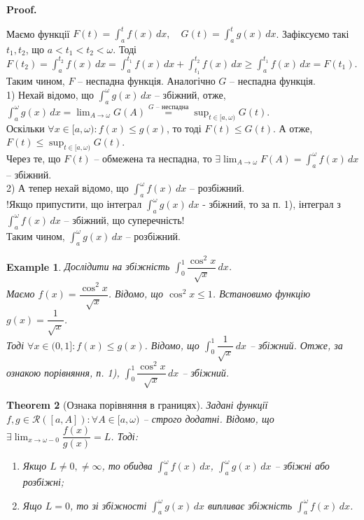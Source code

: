 \documentclass[a4paper, 10pt]{article}
\makeatletter
\def\huge{\displaystyle}
\theoremstyle{theoremdd}
\newtheorem{theorem}{Theorem}[subsection]
\theoremstyle{theoremdd}
\theoremstyle{theoremdd}
\theoremstyle{theoremdd}
\theoremstyle{theoremdd}
\newtheorem{example}[theorem]{Example}
\theoremstyle{theoremdd}
\theoremstyle{theoremdd}
\theoremstyle{theoremdd}
\theoremstyle{theoremdd}
\renewenvironment{proof}[1][Proof.\\]{\par
\pushQED{\hfill \qed}%
\normalfont \topsep6\p@\@plus6\p@\relax
\trivlist
\item\relax
{\bfseries
#1\@addpunct{.}}\hspace\labelsep\ignorespaces
}{%
\popQED\endtrivlist\@endpefalse
}
\makeatother
\begin{document}
\begin{proof}
Маємо функції $F(t) = \huge\int_a^t f(x)\,dx, \quad G(t) = \huge\int_a^t g(x)\,dx$. Зафіксуємо такі $t_1,t_2$, що $a < t_1 < t_2 < \omega$. Тоді $F(t_2) = \huge\int_a^{t_2} f(x)\,dx = \huge\int_a^{t_1} f(x)\,dx + \huge\int_{t_1}^{t_2} f(x)\,dx \geq \huge\int_a^{t_1} f(x)\,dx = F(t_1)$. Таким чином, $F$ -- неспадна функція. Аналогічно $G$ -- неспадна функція.\\
1) Нехай відомо, що $\huge\int_a^\omega g(x)\,dx$ -- збіжний, отже, $\huge\int_a^\omega g(x)\,dx = \huge \lim_{A \to \omega} G(A) \overset{G\text{ -- неспадна}}{=} \sup_{t \in [a,\omega)} G(t)$.\\
Оскільки $\forall x \in [a,\omega): f(x) \leq g(x)$, то тоді $F(t) \leq G(t)$. А отже, $F(t) \leq \huge \sup_{t \in [a,\omega)} G(t)$.\\
Через те, що $F(t)$ -- обмежена та неспадна, то $\huge\exists \lim_{A \to \omega} F(A) = \int_a^\omega f(x)\,dx$ -- збіжний.\\
2) А тепер нехай відомо, що $\huge\int_a^\omega f(x)\,dx$ -- розбіжний.\\
!Якщо припустити, що інтеграл $\huge\int_a^\omega g(x)\,dx$ - збіжний, то за п. 1), інтеграл з $\huge\int_a^\omega f(x)\,dx$ -- збіжний, що суперечність!\\
Таким чином, $\huge\int_a^\omega g(x)\,dx$ -- розбіжний.
\end{proof}

\begin{example}
Дослідити на збіжність $\huge\int_0^1 \dfrac{\cos^2 x}{\sqrt{x}}\,dx$.\\
Маємо $f(x) = \dfrac{\cos^2 x}{\sqrt{x}}$. Відомо, що $\cos^2 x \leq 1$. Встановимо функцію $g(x) = \dfrac{1}{\sqrt{x}}$.\\Тоді $\forall x \in (0,1]: f(x) \leq g(x)$. Відомо, що $\huge\int_0^1 \dfrac{1}{\sqrt{x}}\,dx$ -- збіжний. Отже, за ознакою порівняння, п. 1), $\huge\int_0^1 \dfrac{\cos^2 x}{\sqrt{x}}\,dx$ -- збіжний.
\end{example}

\begin{theorem}[Ознака порівняння в границях]
Задані функції $f,g \in \mathcal{R}([a,A]): \forall A \in [a,\omega)$ -- строго додатні. Відомо, що $\exists \huge \lim_{x \to \omega-0} \dfrac{f(x)}{g(x)} = L$. Тоді:
\begin{enumerate}[nosep,wide=0pt,label={\arabic*)}]
\item Якщо $L \neq 0, \neq \infty$, то обидва $\huge\int_a^\omega f(x)\,dx$, $\huge\int_a^\omega g(x)\,dx$ -- збіжні або розбіжні;
\item Ящо $L = 0$, то зі збіжності $\huge\int_a^\omega g(x)\,dx$ випливає збіжність $\huge\int_a^\omega f(x)\,dx$.
\end{enumerate}
\end{theorem}
\end{document}
